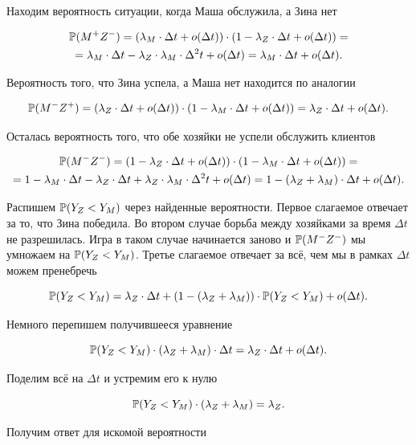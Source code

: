 \documentclass[12pt, a4paper, oneside]{article}
\begin{document}
\begin{sol}
\begin{enumerate}
Находим вероятность ситуации, когда Маша обслужила, а Зина нет

\begin{multline*}
\mathbb{P}(M^{+}Z^{-}) = (\lambda_M \cdot \Delta t + o(\Delta t))\cdot(1 - \lambda_Z \cdot \Delta t + o(\Delta t)) = \\ = \lambda_M \cdot \Delta t - \lambda_Z \cdot \lambda_M \cdot \Delta^2 t + o(\Delta t)  = \lambda_M \cdot \Delta t + o(\Delta t).
\end{multline*} 

Вероятность того, что Зина успела, а Маша нет находится по аналогии

\begin{multline*}
\mathbb{P}(M^{-}Z^{+}) = (\lambda_Z \cdot \Delta t + o(\Delta t))\cdot(1 - \lambda_M \cdot \Delta t + o(\Delta t))  = \lambda_Z \cdot \Delta t + o(\Delta t).
\end{multline*} 

Осталась вероятность того, что обе хозяйки не успели обслужить клиентов

\begin{multline*}
\mathbb{P}(M^{-}Z^{-}) = (1 - \lambda_Z \cdot \Delta t + o(\Delta t))\cdot(1 - \lambda_M \cdot \Delta t + o(\Delta t))  = \\ = 1 - \lambda_M \cdot \Delta t  - \lambda_Z \cdot \Delta t + \lambda_Z \cdot \lambda_M \cdot \Delta^2 t  + o(\Delta t) = 1 - (\lambda_Z + \lambda_M) \cdot \Delta t + o(\Delta t).
\end{multline*} 

Распишем $\mathbb{P}(Y_Z < Y_M)$ через найденные вероятности. Первое слагаемое отвечает за то, что Зина победила. Во втором случае борьба между хозяйками за время $\Delta t$ не разрешилась. Игра в таком случае начинается заново и $\mathbb{P}(M^{-}Z^{-})$ мы умножаем на $\mathbb{P}(Y_Z < Y_M)$. Третье слагаемое отвечает за всё, чем мы в рамках $\Delta t$ можем пренебречь

\[
\mathbb{P}(Y_Z < Y_M) = \lambda_Z \cdot \Delta t + (1 - (\lambda_Z + \lambda_M)) \cdot \mathbb{P}(Y_Z < Y_M) + o(\Delta t).
\]

Немного перепишем получившееся уравнение 

\[
\mathbb{P}(Y_Z < Y_M) \cdot (\lambda_Z + \lambda_M) \cdot \Delta t  = \lambda_Z \cdot \Delta t  + o(\Delta t).
\]

Поделим всё на $\Delta t$ и устремим его к нулю

\[
\mathbb{P}(Y_Z < Y_M) \cdot (\lambda_Z + \lambda_M)  = \lambda_Z. 
\]

Получим ответ для искомой вероятности


\end{enumerate}
\end{sol}
\end{document}
